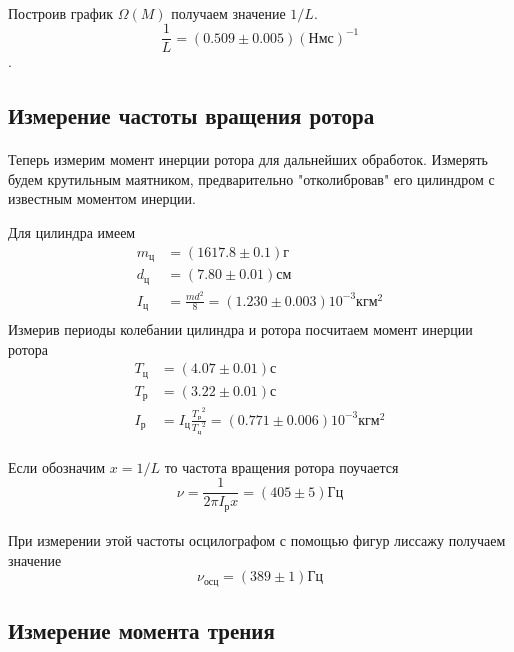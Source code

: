 \documentclass[a4paper, 12pt]{article}
\begin{document}
    \paragraph{}
    Построив график $\Omega(M)$ получаем значение $1/L$.
    \[\frac{1}{L}=(0.509 \pm 0.005)(Нмс)^{-1}\].
    \subsection{Измерение частоты вращения ротора}

    \paragraph{}
    Теперь измерим момент инерции ротора для дальнейших обработок. Измерять будем крутильным маятником, предварительно "отколибровав" его цилиндром с известным моментом инерции.

    Для цилиндра имеем
    \begin{align*}
     m_{ц} &= (1617.8 \pm 0.1)г\\
     d_{ц} &= (7.80 \pm 0.01)см\\
     I_{ц} &= \frac{md^2}{8} = (1.230 \pm 0.003) 10^{-3} кгм^2\\
    \end{align*}
    Измерив периоды колебании цилиндра и ротора посчитаем момент инерции ротора
    \begin{align*}
     T_{ц} &= (4.07 \pm 0.01)с\\
     T_{р} &= (3.22 \pm 0.01)с\\
     I_{р} &= I_{ц} \frac{{T_р}^2}{{T_ц}^2} = (0.771 \pm 0.006)10^{-3} кгм^2
    \end{align*}
    \paragraph{}
    Если обозначим $x=1/L$ то частота вращения ротора поучается
    \[\nu = \frac{1}{2\pi I_р x} = (405 \pm 5)Гц\]

    \paragraph{}
    При измерении этой частоты осцилографом с помощью фигур лиссажу получаем значение
    \[\nu_{осц}=(389 \pm 1)Гц\]

    \subsection{Измерение момента трения}
\end{document}
